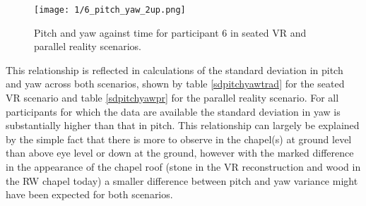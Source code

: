 

\begin{figure}
	\begin{center}
	\texttt{[image: 1/6\_pitch\_yaw\_2up.png]}
	\caption{Pitch and yaw against time for participant 6 in seated VR and parallel reality scenarios.}
	\label{6_pitch_yaw_2up.png}
	\end{center}
\end{figure}

This relationship is reflected in calculations of the standard deviation in pitch and yaw across both scenarios, shown by table \ref{sdpitchyawtrad} for the seated VR scenario and table \ref{sdpitchyawpr} for the parallel reality scenario. For all participants for which the data are available the standard deviation in yaw is substantially higher than that in pitch. This relationship can largely be explained by the simple fact that there is more to observe in the chapel(s) at ground level than above eye level or down at the ground, however with the marked difference in the appearance of the chapel roof (stone in the VR reconstruction and wood in the RW chapel today) a smaller difference between pitch and yaw variance might have been expected for both scenarios.

